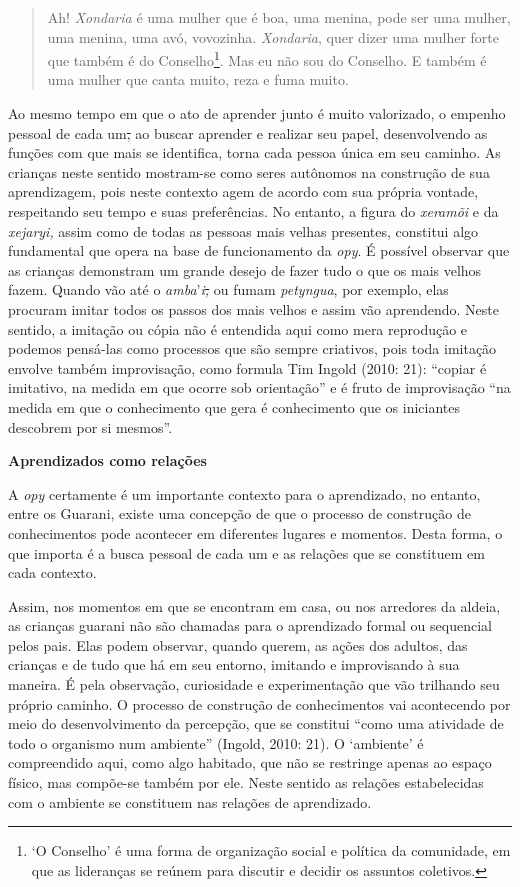 \begin{quote}
Ah! \emph{Xondaria} é uma mulher que é boa, uma menina, pode ser uma
mulher, uma menina, uma avó, vovozinha. \emph{Xondaria}, quer dizer uma
mulher forte que também é do Conselho\footnote{`O Conselho' é uma forma
  de organização social e política da comunidade, em que as lideranças
  se reúnem para discutir e decidir os assuntos coletivos.}. Mas eu não
sou do Conselho. E também é uma mulher que canta muito, reza e fuma
muito.
\end{quote}

Ao mesmo tempo em que o ato de aprender junto é muito valorizado, o
empenho pessoal de cada um\sout{,} ao buscar aprender e realizar seu
papel, desenvolvendo as funções com que mais se identifica, torna cada
pessoa única em seu caminho. As crianças neste sentido mostram-se como
seres autônomos na construção de sua aprendizagem, pois neste contexto
agem de acordo com sua própria vontade, respeitando seu tempo e suas
preferências. No entanto, a figura do \emph{xeramõi} e da
\emph{xejaryi,} assim como de todas as pessoas mais velhas presentes,
constitui algo fundamental que opera na base de funcionamento da
\emph{opy}. É possível observar que as crianças demonstram um grande
desejo de fazer tudo o que os mais velhos fazem. Quando vão até o
\emph{amba}'\emph{i\sout{,}} ou fumam \emph{petyngua}, por exemplo, elas
procuram imitar todos os passos dos mais velhos e assim vão aprendendo.
Neste sentido, a imitação ou cópia não é entendida aqui como mera
reprodução e podemos pensá-las como processos que são sempre criativos,
pois toda imitação envolve também improvisação, como formula Tim Ingold
(2010: 21): ``copiar é imitativo, na medida em que ocorre sob
orientação'' e é fruto de improvisação ``na medida em que o conhecimento
que gera é conhecimento que os iniciantes descobrem por si mesmos''.

\textbf{Aprendizados como relações}

A \emph{opy} certamente é um importante contexto para o aprendizado, no
entanto, entre os Guarani, existe uma concepção de que o processo de
construção de conhecimentos pode acontecer em diferentes lugares e
momentos. Desta forma, o que importa é a busca pessoal de cada um e as
relações que se constituem em cada contexto.

Assim, nos momentos em que se encontram em casa, ou nos arredores da
aldeia, as crianças guarani não são chamadas para o aprendizado formal
ou sequencial pelos pais. Elas podem observar, quando querem, as ações
dos adultos, das crianças e de tudo que há em seu entorno, imitando e
improvisando à sua maneira. É pela observação, curiosidade e
experimentação que vão trilhando seu próprio caminho. O processo de
construção de conhecimentos vai acontecendo por meio do desenvolvimento
da percepção, que se constitui ``como uma atividade de todo o organismo
num ambiente'' (Ingold, 2010: 21). O `ambiente' é compreendido aqui,
como algo habitado, que não se restringe apenas ao espaço físico, mas
compõe-se também por ele. Neste sentido as relações estabelecidas com o
ambiente se constituem nas relações de aprendizado.

